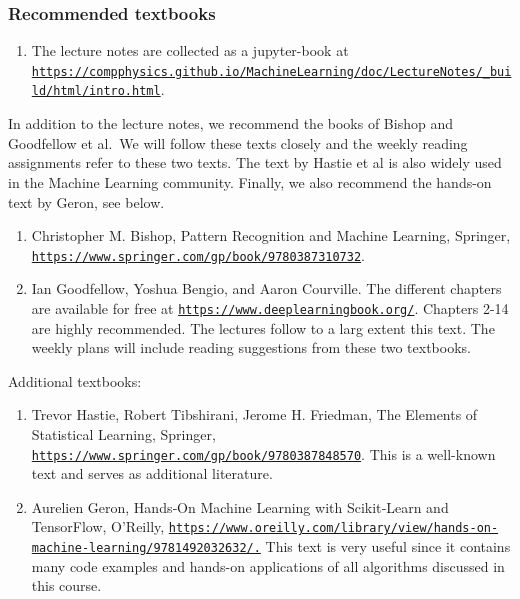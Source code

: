 \documentclass{beamer}
\begin{document}
\begin{frame}
\frametitle{Recommended textbooks}

\begin{enumerate}
\item The lecture notes are collected as a jupyter-book at \href{{https://compphysics.github.io/MachineLearning/doc/LectureNotes/_build/html/intro.html}}{\nolinkurl{https://compphysics.github.io/MachineLearning/doc/LectureNotes/_build/html/intro.html}}.
\end{enumerate}

\noindent
In addition to the lecture notes, we recommend the books of Bishop and Goodfellow et al.~We will follow these texts closely and the weekly reading assignments refer to these two texts. The text by Hastie et al is also widely used in the Machine Learning community. Finally, we also recommend the hands-on text by Geron, see below.

\begin{enumerate}
\item Christopher M. Bishop, Pattern Recognition and Machine Learning, Springer, \href{{https://www.springer.com/gp/book/9780387310732}}{\nolinkurl{https://www.springer.com/gp/book/9780387310732}}. 

\item Ian Goodfellow, Yoshua Bengio, and Aaron Courville. The different chapters are available for free at \href{{https://www.deeplearningbook.org/}}{\nolinkurl{https://www.deeplearningbook.org/}}. Chapters 2-14 are highly recommended. The lectures follow to a larg extent this text. The weekly plans will include reading suggestions from these two textbooks.
\end{enumerate}

\noindent
Additional textbooks:

\begin{enumerate}
\item Trevor Hastie, Robert Tibshirani, Jerome H. Friedman, The Elements of Statistical Learning, Springer, \href{{https://www.springer.com/gp/book/9780387848570}}{\nolinkurl{https://www.springer.com/gp/book/9780387848570}}. This is a well-known text and serves as additional literature.

\item Aurelien Geron, Hands‑On Machine Learning with Scikit‑Learn and TensorFlow, O'Reilly, \href{{https://www.oreilly.com/library/view/hands-on-machine-learning/9781492032632/.}}{\nolinkurl{https://www.oreilly.com/library/view/hands-on-machine-learning/9781492032632/.}} This text is very useful since it contains many code examples and hands-on applications of all algorithms discussed in this course.
\end{enumerate}

\noindent
\end{frame}
\end{document}
